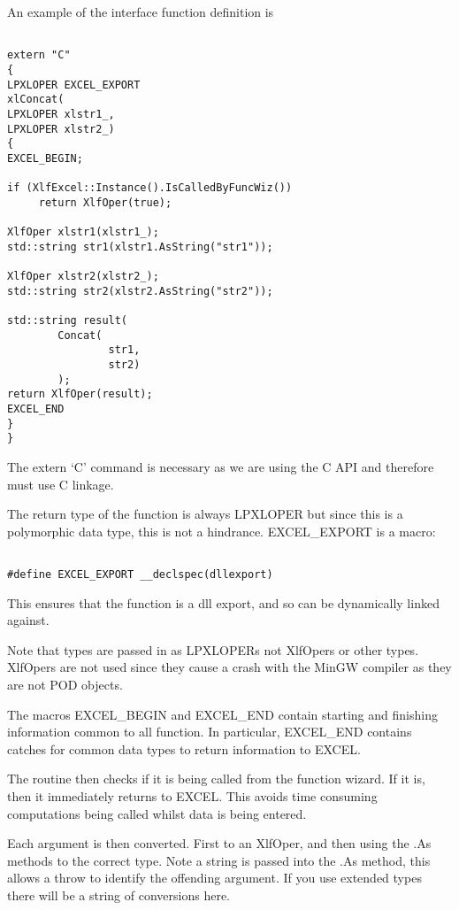\documentclass[12pt,reqno]{amsart}
\numberwithin{equation}{section}
\numberwithin{figure}{section}
\begin{document}
An example of the interface function definition is 

\begin{verbatim}

extern "C"
{
LPXLOPER EXCEL_EXPORT
xlConcat(
LPXLOPER xlstr1_,
LPXLOPER xlstr2_)
{
EXCEL_BEGIN;

if (XlfExcel::Instance().IsCalledByFuncWiz())
     return XlfOper(true);

XlfOper xlstr1(xlstr1_);
std::string str1(xlstr1.AsString("str1"));

XlfOper xlstr2(xlstr2_);
std::string str2(xlstr2.AsString("str2"));

std::string result(
        Concat(
                str1,
                str2)
        );
return XlfOper(result);
EXCEL_END
}
}

\end{verbatim}

The extern `C' command is necessary as we are using the C API and
therefore must use C linkage. 

The return type of the function is always LPXLOPER but since this is a
polymorphic data type, this is not a hindrance.  EXCEL\_EXPORT is a
macro:
\begin{verbatim}

#define EXCEL_EXPORT __declspec(dllexport)

\end{verbatim}
This ensures that the function is a dll export, and so can be
dynamically linked against. 

Note that types are passed in as LPXLOPERs not XlfOpers or other
types. XlfOpers are not used since they cause a crash with the MinGW
compiler as they are not POD objects. 

The macros EXCEL\_BEGIN and EXCEL\_END contain starting and finishing
information common to all function. In particular, EXCEL\_END contains
catches for common data types to return information to EXCEL. 

The routine then checks if it is being called from the function
wizard. If it is, then it immediately returns to EXCEL. This avoids
time consuming computations being called whilst data is being
entered. 

Each argument is then converted. First to an XlfOper, and then using
the .As methods to the correct type. Note a string is passed into the
.As method, this allows a throw to identify the offending argument. If
you use extended types there will be a string of conversions here. 
\end{document}
